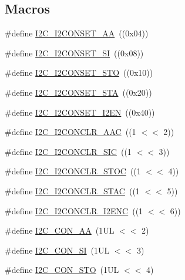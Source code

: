 \subsection*{Macros}
\begin{DoxyCompactItemize}
\item 
\#define \hyperlink{group___i2_c__18_x_x__43_x_x_ga784c4b2fe7f3299e338655d2ddbf283c}{I2\+C\+\_\+\+I2\+C\+O\+N\+S\+E\+T\+\_\+\+AA}~((0x04))
\item 
\#define \hyperlink{group___i2_c__18_x_x__43_x_x_gaa447cd2686805ef8009fc599144ee3dc}{I2\+C\+\_\+\+I2\+C\+O\+N\+S\+E\+T\+\_\+\+SI}~((0x08))
\item 
\#define \hyperlink{group___i2_c__18_x_x__43_x_x_gaae292803a059b84eac20ab8777d113af}{I2\+C\+\_\+\+I2\+C\+O\+N\+S\+E\+T\+\_\+\+S\+TO}~((0x10))
\item 
\#define \hyperlink{group___i2_c__18_x_x__43_x_x_gabaad3370eb35644c135d40f06adbbba0}{I2\+C\+\_\+\+I2\+C\+O\+N\+S\+E\+T\+\_\+\+S\+TA}~((0x20))
\item 
\#define \hyperlink{group___i2_c__18_x_x__43_x_x_gab836acc31e0572bb0d0db614f0641f15}{I2\+C\+\_\+\+I2\+C\+O\+N\+S\+E\+T\+\_\+\+I2\+EN}~((0x40))
\item 
\#define \hyperlink{group___i2_c__18_x_x__43_x_x_gaa13b19babb8442aa9047f8ecb92a908d}{I2\+C\+\_\+\+I2\+C\+O\+N\+C\+L\+R\+\_\+\+A\+AC}~((1 $<$$<$ 2))
\item 
\#define \hyperlink{group___i2_c__18_x_x__43_x_x_ga36753112210a8c33d566b572b63b753b}{I2\+C\+\_\+\+I2\+C\+O\+N\+C\+L\+R\+\_\+\+S\+IC}~((1 $<$$<$ 3))
\item 
\#define \hyperlink{group___i2_c__18_x_x__43_x_x_ga449d7af35550484c4dfefcddd01095b8}{I2\+C\+\_\+\+I2\+C\+O\+N\+C\+L\+R\+\_\+\+S\+T\+OC}~((1 $<$$<$ 4))
\item 
\#define \hyperlink{group___i2_c__18_x_x__43_x_x_gab6148bf41d7fc32bd259d2f6a7d7667d}{I2\+C\+\_\+\+I2\+C\+O\+N\+C\+L\+R\+\_\+\+S\+T\+AC}~((1 $<$$<$ 5))
\item 
\#define \hyperlink{group___i2_c__18_x_x__43_x_x_ga92718ac11d46f6e32d526749f09d01b2}{I2\+C\+\_\+\+I2\+C\+O\+N\+C\+L\+R\+\_\+\+I2\+E\+NC}~((1 $<$$<$ 6))
\item 
\#define \hyperlink{group___i2_c__18_x_x__43_x_x_gafd39e9ced8b71fd55deb05d7a23752b9}{I2\+C\+\_\+\+C\+O\+N\+\_\+\+AA}~(1\+U\+L $<$$<$ 2)
\item 
\#define \hyperlink{group___i2_c__18_x_x__43_x_x_gad53ba19314d57093aaa5076897604a50}{I2\+C\+\_\+\+C\+O\+N\+\_\+\+SI}~(1\+U\+L $<$$<$ 3)
\item 
\#define \hyperlink{group___i2_c__18_x_x__43_x_x_ga9704c03008de747eb42bde530a67350b}{I2\+C\+\_\+\+C\+O\+N\+\_\+\+S\+TO}~(1\+U\+L $<$$<$ 4)

\end{DoxyCompactItemize}
